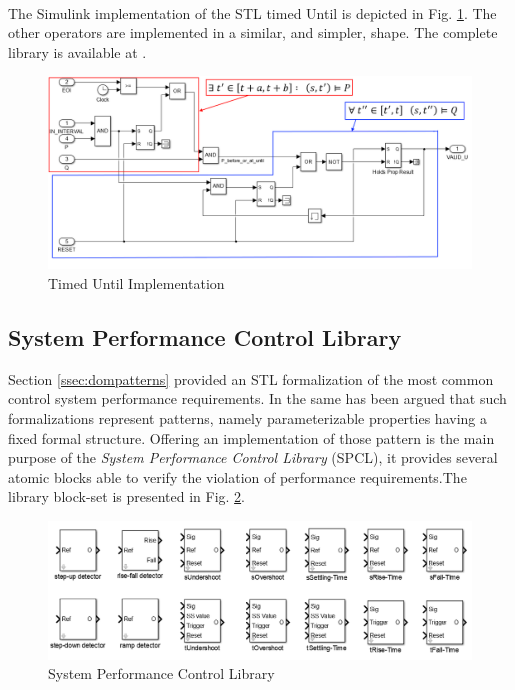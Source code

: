\paragraph{} The Simulink implementation of the STL timed Until is depicted in Fig. \ref{fig:untimpl}. The other operators are implemented in a similar, and simpler, shape. The complete library is available at \citep{balsrepo}.
\begin{figure}[!h]
\centering
\includegraphics[width=\textwidth]{Figs/untimpl.png}
\caption{Timed Until Implementation}
\label{fig:untimpl}
\end{figure}

\subsection{System Performance Control Library}

Section \ref{ssec:dompatterns} provided an STL formalization of the most common control system performance requirements. In the same has been argued that such formalizations represent patterns, namely parameterizable properties having a fixed formal structure. Offering an implementation of those pattern is the main purpose of the \textit{System Performance Control Library} (SPCL), it provides several atomic blocks able to verify the violation of performance requirements.The library block-set is presented in Fig. \ref{fig:spctrlib}. 

\begin{figure}[h]
\centering
\includegraphics[width=\textwidth]{Figs/spclib.PNG}
\caption{System Performance Control Library}
\label{fig:spctrlib}
\end{figure}


